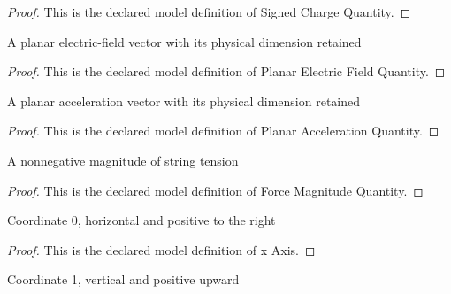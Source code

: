 \begin{proof}
  This is the declared model definition of Signed Charge Quantity.
\end{proof}
\begin{definition}
  \label{def:physics:phyx-mini-0905:phyxminiproblems-problemphyxmini0905-planarelectricfieldquantity}
  A planar electric-field vector with its physical dimension retained
\end{definition}
\begin{proof}
  This is the declared model definition of Planar Electric Field Quantity.
\end{proof}
\begin{definition}
  \label{def:physics:phyx-mini-0905:phyxminiproblems-problemphyxmini0905-planaraccelerationquantity}
  A planar acceleration vector with its physical dimension retained
\end{definition}
\begin{proof}
  This is the declared model definition of Planar Acceleration Quantity.
\end{proof}
\begin{definition}
  \label{def:physics:phyx-mini-0905:phyxminiproblems-problemphyxmini0905-forcemagnitudequantity}
  A nonnegative magnitude of string tension
\end{definition}
\begin{proof}
  This is the declared model definition of Force Magnitude Quantity.
\end{proof}
\begin{definition}[x Axis]
  \label{def:physics:phyx-mini-0905:phyxminiproblems-problemphyxmini0905-xaxis}
  Coordinate 0, horizontal and positive to the right
\end{definition}
\begin{proof}
  This is the declared model definition of x Axis.
\end{proof}
\begin{definition}[y Axis]
  \label{def:physics:phyx-mini-0905:phyxminiproblems-problemphyxmini0905-yaxis}
  Coordinate 1, vertical and positive upward
\end{definition}
